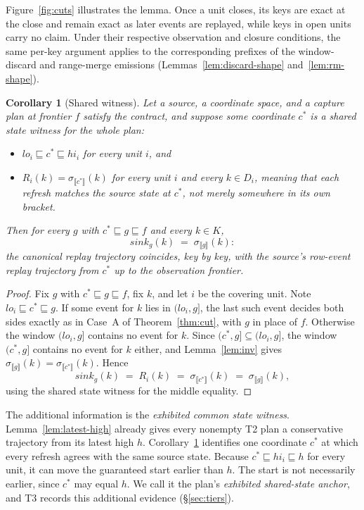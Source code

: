 \documentclass[sigconf,nonacm,10pt]{acmart}
\theoremstyle{plain}
\newtheorem{corollary}{Corollary}
\theoremstyle{definition}
\newcommand{\den}[1]{\llbracket #1 \rrbracket}   %
\newcommand{\pre}{\sqsubseteq}                   %
\newcommand{\window}[2]{(#1,#2]}                 %
\newcommand{\sink}{\mathit{sink}}                %
\newcommand{\keys}{K}                            %
\begin{document}
Figure~\ref{fig:cuts} illustrates the lemma. Once a unit closes, its
keys are exact at the close and remain exact as later events are
replayed, while keys in open units carry no claim. Under their respective
observation and closure conditions, the same per-key argument applies to
the corresponding prefixes of the window-discard and range-merge
emissions (Lemmas~\ref{lem:discard-shape} and~\ref{lem:rm-shape}).

\begin{corollary}[Shared witness]\label{cor:shared}
Let a source, a coordinate space, and a capture plan at frontier
$f$ satisfy the contract, and suppose some coordinate $c^{\ast}$
is a \emph{shared state witness} for the whole plan:
\begin{itemize}
\item $lo_i \pre c^{\ast} \pre hi_i$ for every unit $i$, and
\item $R_i(k) = \sigma_{\den{c^{\ast}}}(k)$ for every unit $i$ and
every $k \in D_i$, meaning that each refresh matches the source state \emph{at} $c^{\ast}$, not
merely somewhere in its own bracket.
\end{itemize}
Then for every $g$ with $c^{\ast} \pre g \pre f$ and every
$k \in \keys$,
\[
\sink_g(k) \;=\; \sigma_{\den{g}}(k):
\]
the canonical replay trajectory coincides, key by key, with the
source's row-event replay trajectory from $c^{\ast}$ up to the
observation frontier.
\end{corollary}

\begin{proof}
Fix $g$ with $c^{\ast} \pre g \pre f$, fix $k$, and let $i$ be the
covering unit. Note $lo_i \pre c^{\ast} \pre g$. If some event for
$k$ lies in $\window{lo_i}{g}$, the last such event decides both
sides exactly as in Case~A of Theorem~\ref{thm:cut}, with $g$ in
place of $f$. Otherwise the window $\window{lo_i}{g}$ contains no event for $k$. Since $\window{c^{\ast}}{g} \subseteq \window{lo_i}{g}$, the window $\window{c^{\ast}}{g}$ contains no event for $k$ either, and
Lemma~\ref{lem:inv} gives
$\sigma_{\den{g}}(k) = \sigma_{\den{c^{\ast}}}(k)$. Hence
\[
\sink_g(k) \;=\; R_i(k)
          \;=\; \sigma_{\den{c^{\ast}}}(k)
          \;=\; \sigma_{\den{g}}(k),
\]
using the shared state witness for the middle equality.

\end{proof}

The additional information is the \emph{exhibited common state
witness}. Lemma~\ref{lem:latest-high} already gives every nonempty T2
plan a conservative trajectory from its latest high $h$.
Corollary~\ref{cor:shared} identifies one coordinate $c^{\ast}$ at
which every refresh agrees with the same source state. Because
$c^{\ast} \pre hi_i \pre h$ for every unit, it can move the guaranteed
start earlier than $h$. The start is not necessarily earlier, since
$c^{\ast}$ may equal $h$. We call it the plan's \emph{exhibited
shared-state anchor}, and T3 records this additional evidence
(\S\ref{sec:tiers}).
\end{document}
